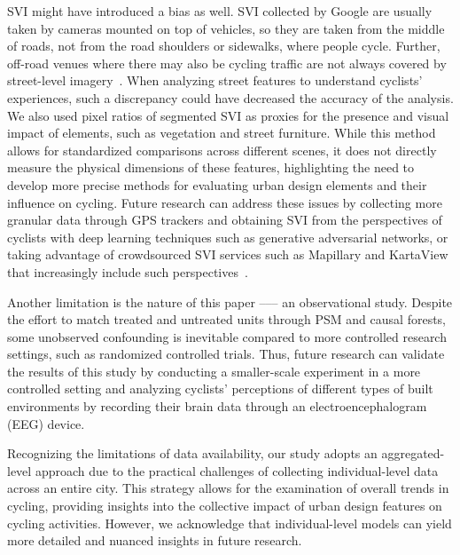 \documentclass[preprint,12pt, authoryear]{elsarticle}
\begin{document}
SVI might have introduced a bias as well.
SVI collected by Google are usually taken by cameras mounted on top of vehicles, so they are taken from the middle of roads, not from the road shoulders or sidewalks, where people cycle.
Further, off-road venues where there may also be cycling traffic are not always covered by street-level imagery~\citep{2023_cities_pos}.
When analyzing street features to understand cyclists' experiences, such a discrepancy could have decreased the accuracy of the analysis.
We also used pixel ratios of segmented SVI as proxies for the presence and visual impact of elements, such as vegetation and street furniture. While this method allows for standardized comparisons across different scenes, it does not directly measure the physical dimensions of these features, highlighting the need to develop more precise methods for evaluating urban design elements and their influence on cycling.
Future research can address these issues by collecting more granular data through GPS trackers and obtaining SVI from the perspectives of cyclists with deep learning techniques such as generative adversarial networks, or taking advantage of crowdsourced SVI services such as Mapillary and KartaView that increasingly include such perspectives~\citep{ito_translating_2024, hou_global_2024, 2023_jag_svi_sensitivity}.

Another limitation is the nature of this paper ––– an observational study.
Despite the effort to match treated and untreated units through PSM and causal forests, some unobserved confounding is inevitable compared to more controlled research settings, such as randomized controlled trials. Thus, future research can validate the results of this study by conducting a smaller-scale experiment in a more controlled setting and analyzing cyclists' perceptions of different types of built environments by recording their brain data through an electroencephalogram (EEG) device. 

Recognizing the limitations of data availability, our study adopts an aggregated-level approach due to the practical challenges of collecting individual-level data across an entire city. This strategy allows for the examination of overall trends in cycling, providing insights into the collective impact of urban design features on cycling activities. However, we acknowledge that individual-level models can yield more detailed and nuanced insights in future research. 
\end{document}
